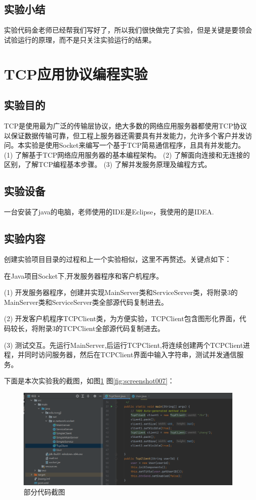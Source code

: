 \documentclass[lang=cn,11pt,a4paper,cite=authoryear]{elegantpaper}
\begin{document}
\subsection{实验小结}
实验代码金老师已经帮我们写好了，所以我们很快做完了实验，但是关键是要领会试验运行的原理，而不是只关注实验运行的结果。

\section{TCP应用协议编程实验}
\subsection{实验目的}
TCP是使用最为广泛的传输层协议，绝大多数的网络应用服务器都使用TCP协议以保证数据传输可靠，但工程上服务器还需要具有并发能力，允许多个客户并发访问。本实验是使用Socket来编写一个基于TCP简易通信程序，且具有并发能力。
(1)	了解基于TCP网络应用服务器的基本编程架构。
(2)	了解面向连接和无连接的区别，了解TCP编程基本步骤。
(3)	了解并发服务原理及编程方式。

\subsection{实验设备}
一台安装了java的电脑，老师使用的IDE是Eclipse，我使用的是IDEA.

\subsection{实验内容}
创建实验项目目录的过程和上一个实验相似，这里不再赘述。关键点如下：

在Java项目Socket下,开发服务器程序和客户机程序。

(1)	开发服务器程序，创建并实现MainServer类和ServiceServer类，将附录3的MainServer类和ServiceServer类全部源代码复制进去。

(2)	开发客户机程序TCPClient类，为方便实验，TCPClient包含图形化界面，代码较长，将附录3的TCPClient全部源代码复制进去。

(3)	测试交互。先运行MainServer,后运行TCPClient,将连续创建两个TCPClient进程，并同时访问服务器，然后在TCPClient界面中输入字符串，测试并发通信服务。

下面是本次实验我的截图，如图\ref{fig:screenshot008} 图\ref{fig:screenshot007}：

\begin{figure}[htbp]
	\centering
	\includegraphics[width=0.8\linewidth]{image/screenshot008}
	\caption{部分代码截图}
	\label{fig:screenshot008}
\end{figure}
\end{document}
